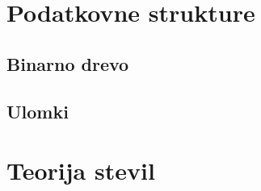 \documentclass[10pt,a4paper,oneside]{book}
\begin{document}

\chapter{Podatkovne strukture}
\section{Binarno drevo}

\section{Ulomki}



\chapter{Teorija stevil}
\end{document}
